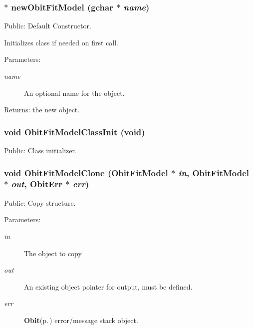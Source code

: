 \subsubsection{$\ast$ new\-Obit\-Fit\-Model (gchar $\ast$ {\em name})}\label{ObitFitModel_8h_a11}


Public: Default Constructor. 

Initializes class if needed on first call. \begin{Desc}
\item[Parameters:]
\begin{description}
\item[{\em name}]An optional name for the object. \end{description}
\end{Desc}
\begin{Desc}
\item[Returns:]the new object. \end{Desc}
\subsubsection{\setlength{\rightskip}{0pt plus 5cm}void Obit\-Fit\-Model\-Class\-Init (void)}\label{ObitFitModel_8h_a10}


Public: Class initializer. 

\subsubsection{\setlength{\rightskip}{0pt plus 5cm}void Obit\-Fit\-Model\-Clone ({\bf Obit\-Fit\-Model} $\ast$ {\em in}, {\bf Obit\-Fit\-Model} $\ast$ {\em out}, {\bf Obit\-Err} $\ast$ {\em err})}\label{ObitFitModel_8h_a15}


Public: Copy structure. 

\begin{Desc}
\item[Parameters:]
\begin{description}
\item[{\em in}]The object to copy \item[{\em out}]An existing object pointer for output, must be defined. \item[{\em err}]{\bf Obit}{\rm (p.\,\pageref{structObit})} error/message stack object. \end{description}
\end{Desc}
